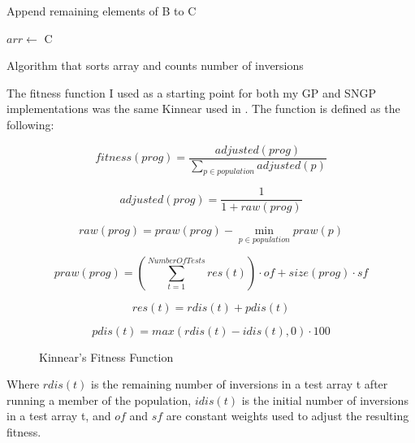 \documentclass{article}
\newcommand{\assign}[2]{$#1 \leftarrow$ #2}
\begin{document}
\begin{algorithm}
{{{                        Append remaining elements of B to C
                        
                    }
                    
                    \assign{arr}{C}
                    
                }
                
                
            }
            
            \caption{Algorithm that sorts array and counts number of inversions}
            
            
            
            \label{alg:countInv}
            
        \end{algorithm}
        
        The fitness function I used as a starting point for both my GP and SNGP implementations was the same Kinnear used in \cite{kinnear_evolving_1993,kinnear_generality_1993}. The function is defined as the following:
        
        \begin{figure}[h]
            $$fitness(prog) = \frac{adjusted(prog)}{\sum_{p\in population}^{}adjusted(p)}$$
            
            $$adjusted(prog) = \frac{1}{1 + raw(prog)}$$
            
            $$raw(prog) = praw(prog) - \min_{p\in population} praw(p)$$
            
            $$praw(prog) = \left(\sum_{t = 1}^{Number Of Tests}res(t)\right) \cdot of + size(prog) \cdot sf$$
            
            $$res(t) = rdis(t) + pdis(t)$$
            
            $$pdis(t) = max(rdis(t) - idis(t), 0) \cdot 100$$
            
            \caption{Kinnear's Fitness Function}
            
            \label{kinnear_fitness}		
        
        \end{figure}
        Where $rdis(t)$ is the remaining number of inversions in a test array t after running a member of the population, $idis(t)$ is the initial number of inversions in a test array t, and $of$ and $sf$ are constant weights used to adjust the resulting fitness.
\end{document}
